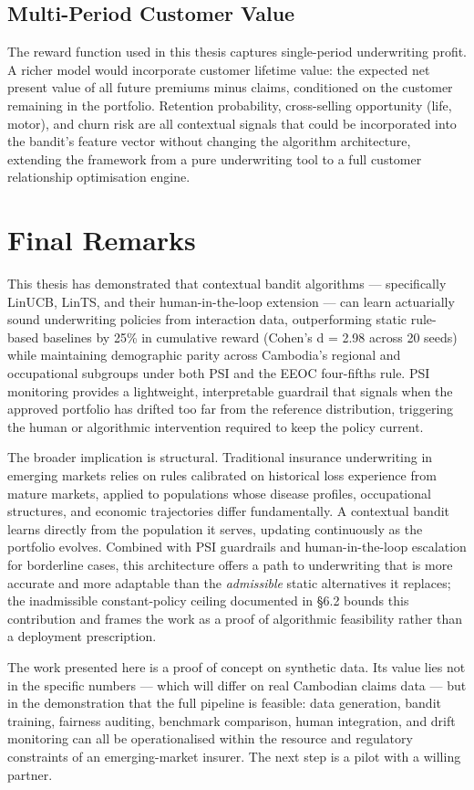 \subsection{Multi-Period Customer Value}\label{multi-period-customer-value}

The reward function used in this thesis captures single-period underwriting profit. A richer model would incorporate customer lifetime value: the expected net present value of all future premiums minus claims, conditioned on the customer remaining in the portfolio. Retention probability, cross-selling opportunity (life, motor), and churn risk are all contextual signals that could be incorporated into the bandit's feature vector without changing the algorithm architecture, extending the framework from a pure underwriting tool to a full customer relationship optimisation engine.

\section{Final Remarks}\label{final-remarks}

This thesis has demonstrated that contextual bandit algorithms --- specifically LinUCB, LinTS, and their human-in-the-loop extension --- can learn actuarially sound underwriting policies from interaction data, outperforming static rule-based baselines by 25\% in cumulative reward (Cohen's d = 2.98 across 20 seeds) while maintaining demographic parity across Cambodia's regional and occupational subgroups under both PSI and the EEOC four-fifths rule. PSI monitoring provides a lightweight, interpretable guardrail that signals when the approved portfolio has drifted too far from the reference distribution, triggering the human or algorithmic intervention required to keep the policy current.

The broader implication is structural. Traditional insurance underwriting in emerging markets relies on rules calibrated on historical loss experience from mature markets, applied to populations whose disease profiles, occupational structures, and economic trajectories differ fundamentally. A contextual bandit learns directly from the population it serves, updating continuously as the portfolio evolves. Combined with PSI guardrails and human-in-the-loop escalation for borderline cases, this architecture offers a path to underwriting that is more accurate and more adaptable than the \emph{admissible} static alternatives it replaces; the inadmissible constant-policy ceiling documented in §6.2 bounds this contribution and frames the work as a proof of algorithmic feasibility rather than a deployment prescription.

The work presented here is a proof of concept on synthetic data. Its value lies not in the specific numbers --- which will differ on real Cambodian claims data --- but in the demonstration that the full pipeline is feasible: data generation, bandit training, fairness auditing, benchmark comparison, human integration, and drift monitoring can all be operationalised within the resource and regulatory constraints of an emerging-market insurer. The next step is a pilot with a willing partner.

